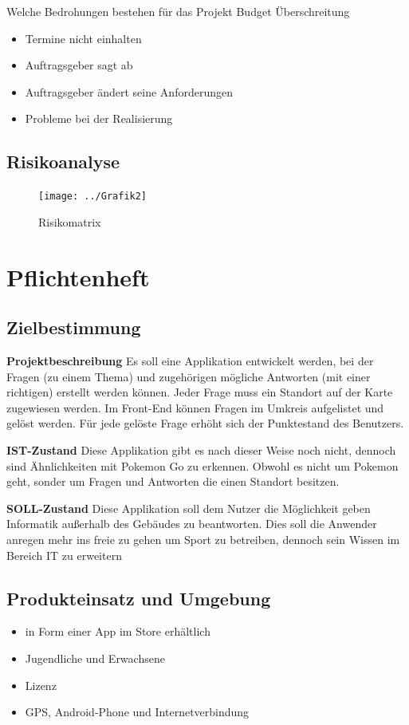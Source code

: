 Welche Bedrohungen bestehen für das Projekt
Budget Überschreitung
\begin{itemize}
	\item Termine nicht einhalten
	\item Auftragsgeber sagt ab
	\item Auftragsgeber ändert seine Anforderungen
	\item Probleme bei der Realisierung
\end{itemize}



\subsection{Risikoanalyse}
\begin{figure}
	\centering
	\texttt{[image: ../Grafik2]}
	\caption{Risikomatrix}
	\label{fig:grafik2}
\end{figure}

\section{Pflichtenheft}
\subsection{Zielbestimmung}

\textbf {Projektbeschreibung}
 Es soll eine Applikation entwickelt werden, bei der Fragen (zu einem Thema) und zugehörigen mögliche Antworten (mit einer richtigen) erstellt werden können. Jeder Frage muss ein Standort auf der Karte zugewiesen werden.
Im Front-End können Fragen im Umkreis aufgelistet und gelöst werden. Für jede gelöste Frage erhöht sich der Punktestand des Benutzers.

\textbf {IST-Zustand}
Diese Applikation gibt es nach dieser Weise noch nicht, dennoch sind Ähnlichkeiten mit Pokemon Go zu erkennen. Obwohl es nicht um Pokemon geht, sonder um Fragen und Antworten die einen Standort besitzen.

\textbf {SOLL-Zustand}
Diese Applikation soll dem Nutzer die Möglichkeit geben Informatik außerhalb des Gebäudes zu beantworten. Dies soll die Anwender anregen mehr ins freie zu gehen um Sport zu betreiben, dennoch sein Wissen im Bereich IT zu erweitern


\subsection{Produkteinsatz und Umgebung}
\begin{itemize}
	\item in Form einer App im Store erhältlich
	\item Jugendliche und Erwachsene
	\item Lizenz
	\item GPS, Android-Phone und Internetverbindung
\end{itemize}
